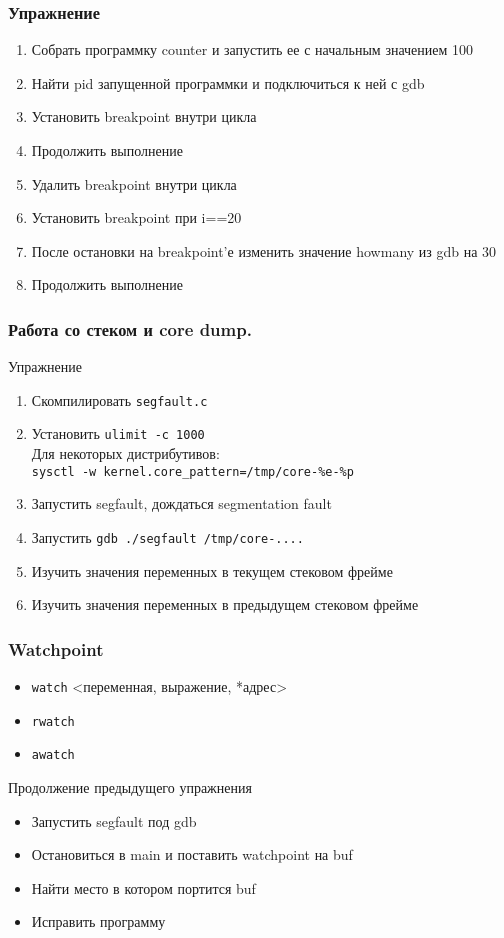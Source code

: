\begin{frame}
  \frametitle{Упражнение}
  \begin{enumerate}
    \item Собрать программку counter и запустить ее с начальным значением 100
    \item Найти pid запущенной программки и подключиться к ней с gdb
    \item Установить breakpoint внутри цикла
    \item Продолжить выполнение
    \item Удалить breakpoint внутри цикла
    \item Установить breakpoint при i==20
    \item После остановки на breakpoint'е изменить значение howmany из gdb на 30
    \item Продолжить выполнение
  \end{enumerate}
\end{frame}

\begin{frame}
  \frametitle{Работа со стеком и core dump.}
  \begin{center}
    Упражнение
  \end{center}
  \begin{enumerate}
   \item Скомпилировать \texttt{segfault.c}
   \item Установить \texttt{ulimit -c 1000}\\
	   {\small Для некоторых дистрибутивов:\\ {\tt sysctl -w kernel.core\_pattern=/tmp/core-\%e-\%p}}
   \item Запустить segfault, дождаться segmentation fault
   \item Запустить \texttt{gdb ./segfault /tmp/core-....}
   \item Изучить значения переменных в текущем стековом фрейме
   \item Изучить значения переменных в предыдущем стековом фрейме
  \end{enumerate}
\end{frame}

\begin{frame}
  \frametitle{Watchpoint}
  \begin{itemize}
    \item \texttt{watch} <переменная, выражение, *адрес>
    \item \texttt{rwatch} 
    \item \texttt{awatch}
  \end{itemize}
  \begin{center}
    Продолжение предыдущего упражнения
  \end{center}
  \begin{itemize}
    \item Запустить segfault под gdb
    \item Остановиться в main и поставить watchpoint на buf
    \item Найти место в котором портится buf
    \item Исправить программу
  \end{itemize}
\end{frame}

